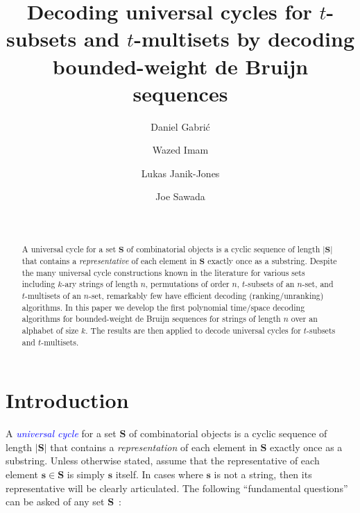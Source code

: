 \documentclass[US-letter,USenglish,authorcolumns,autoref]{lipics-v2021}
\title{Decoding universal cycles for $t$-subsets and $t$-multisets by decoding bounded-weight de Bruijn sequences}
\author{Daniel Gabri\'{c}}{University of Guelph, Canada}{}{}{}
\author{Wazed Imam}{University of Guelph, Canada}{}{}{}
\author{Lukas Janik-Jones}{University of Guelph, Canada}{}{}{}
\author{Joe Sawada}{University of Guelph, Canada}{}{}{}
\author{~}{~}{}{}{}
\newcommand{\bS}{\mathbf{S}}
\newcommand{\bs}{\mathbf{s}}
\newcommand{\red}[1] {\textcolor{red}{#1}}
\newcommand{\defo}[1] {\emph{\textcolor{blue}{#1}}}
\begin{document}

\maketitle

\frenchspacing

\begin{abstract}  \normalsize
A universal cycle for a set $\mathbf{S}$ of combinatorial objects is a cyclic sequence of length $|\mathbf{S}|$ that contains a \emph{representative} of each element in $\mathbf{S}$ exactly once as a substring.
Despite the many universal cycle constructions known in the literature for various sets including $k$-ary strings of length $n$, permutations of order $n$, $t$-subsets of an $n$-set, and $t$-multisets of an $n$-set, remarkably few have efficient decoding (ranking/unranking) algorithms.  In this paper we develop the first polynomial time/space decoding algorithms for bounded-weight de Bruijn sequences for strings of length $n$ over an alphabet of size $k$.  %
The results are then applied to decode universal cycles for $t$-subsets and $t$-multisets. 
\end{abstract}



\section{Introduction}  







A \defo{universal cycle} for a set $\mathbf{S}$ of combinatorial objects is a cyclic sequence of length $|\mathbf{S}|$ that contains a \emph{representation} of each element in $\mathbf{S}$ exactly once as a substring.  Unless otherwise stated, assume that the representative of each element $\bs \in \bS$ is simply $\bs$ itself.  In cases where $\bs$ is not a string, then its representative will be clearly articulated.  The following ``fundamental questions'' can be asked of any set $\bS$~\cite{chung}:
%
\smallskip
\end{document}
